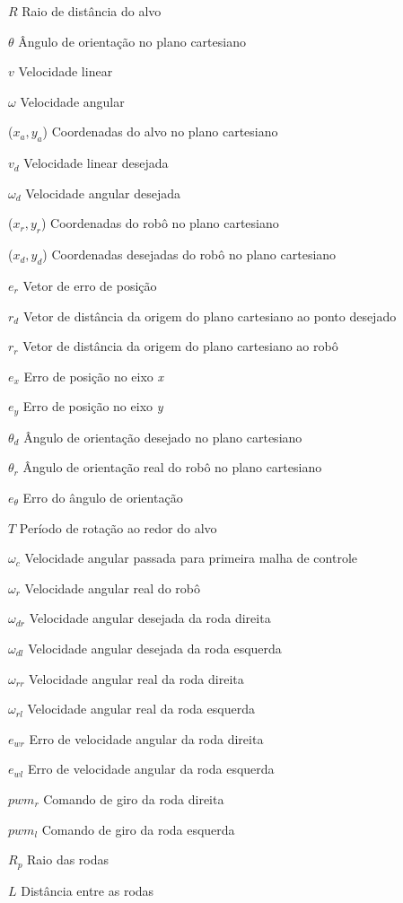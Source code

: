 %
%

\begin{simbolos}
	\item[$R$] Raio de distância do alvo
	\item[$\theta$] Ângulo de orientação no plano cartesiano
	\item[$v$] Velocidade linear
	\item[$\omega$] Velocidade angular
	\item[($x_{a},y_{a}$)] Coordenadas do alvo no plano cartesiano
	\item[$v_{d}$] Velocidade linear desejada
	\item[$\omega_{d}$] Velocidade angular desejada
	\item[($x_{r},y_{r}$)] Coordenadas do robô no plano cartesiano
	\item[($x_{d},y_{d}$)] Coordenadas desejadas do robô no plano cartesiano
	\item[$e_{r}$] Vetor de erro de posição
	\item[$r_{d}$] Vetor de distância da origem do plano cartesiano ao ponto desejado
	\item[$r_{r}$] Vetor de distância da origem do plano cartesiano ao robô
	\item[$e_{x}$] Erro de posição no eixo \emph{x}
	\item[$e_{y}$] Erro de posição no eixo \emph{y}
	\item[$\theta_{d}$] Ângulo de orientação desejado no plano cartesiano
	\item[$\theta_{r}$] Ângulo de orientação real do robô no plano cartesiano
	\item[$e_{\theta}$] Erro do ângulo de orientação
	\item[$T$] Período de rotação ao redor do alvo
	\item[$ \omega _{c} $] Velocidade angular passada para primeira malha de controle
	\item[$ \omega _{r} $] Velocidade angular real do robô
	\item[$ \omega _{dr} $] Velocidade angular desejada da roda direita
	\item[$ \omega _{dl} $] Velocidade angular desejada da roda esquerda
    \item[$ \omega _{rr} $] Velocidade angular real da roda direita
    \item[$ \omega _{rl} $] Velocidade angular real da roda esquerda
    \item[$  e_{wr} $] Erro de velocidade angular da roda direita 
    \item[$  e_{wl} $] Erro de velocidade angular da roda esquerda
    \item[$  pwm_{r} $] Comando de giro da roda direita 
    \item[$  pwm_{l} $] Comando de giro da roda esquerda
    \item[$ R_{p} $] Raio das rodas
    \item[$ L $] Distância entre as rodas
\end{simbolos}
